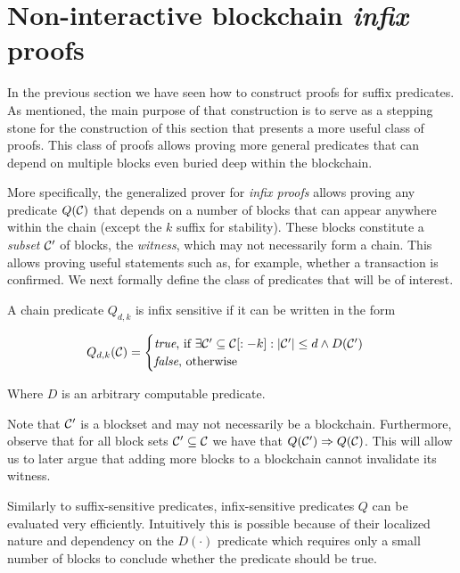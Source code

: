\section{Non-interactive blockchain \emph{infix} proofs}
\label{sec:infix}

In the previous section we have seen how to construct proofs for suffix
predicates. As mentioned, the main purpose of that construction is to serve as a
stepping stone for the construction of this section that presents a more useful
class of proofs. This class of proofs allows proving more general predicates
that can depend on multiple blocks even buried deep within the blockchain.

More specifically, the generalized prover for \emph{infix proofs} allows
proving any predicate $Q(\mathcal{C})$ that depends on a number of blocks that can
appear anywhere within the chain (except the $k$ suffix for stability). These
blocks constitute a \emph{subset} $\mathcal{C}'$ of blocks, the \emph{witness},
which may not necessarily form a chain. This allows proving useful statements
such as, for example, whether a transaction is confirmed. We next formally
define the class of predicates that will be of interest.

\begin{definition}
\label{def:infix}
A chain predicate $Q_{d,k}$ is \textnormal{infix sensitive} if it can be
written in the form

$$
Q_{d,k}(\mathcal{C}) =
\begin{cases}
  \text{\emph{true}, if }
    \exists \mathcal{C}' \subseteq \mathcal{C}[:-k]: |\mathcal{C}'| \leq d \land D(\mathcal{C}')\\
  \text{\emph{false}, otherwise}
\end{cases}
$$

Where $D$ is an arbitrary computable predicate.
\end{definition}

Note that $\mathcal{C}'$ is a blockset and may not necessarily be a blockchain.
Furthermore, observe that for all block sets $\mathcal{C}' \subseteq \mathcal{C}$ we have
that $Q(\mathcal{C}') \Rightarrow Q(\mathcal{C})$. This will allow us to later argue that
adding more blocks to a blockchain cannot invalidate its witness.

Similarly to suffix-sensitive predicates, infix-sensitive predicates $Q$ can be
evaluated very efficiently. Intuitively this is possible because of their
localized nature and dependency on the $D(\cdot)$ predicate which requires only
a small number of blocks to conclude whether the predicate should be true.

